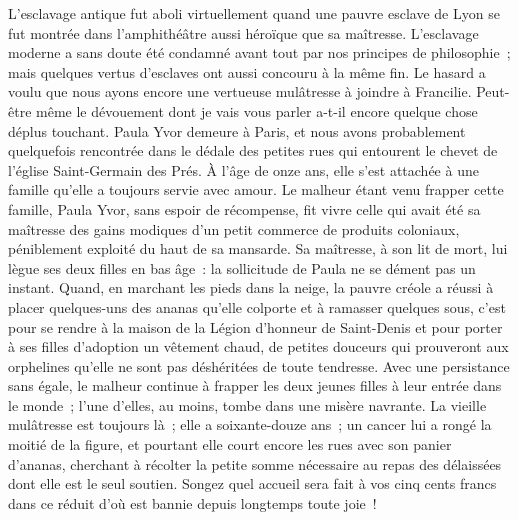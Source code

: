 \documentclass[french,twoside]{book} %
\newcommand\orgName[1]{#1}
\newcommand\persName[1]{#1}
\newcommand\placeName[1]{#1}
\begin{document}
L’esclavage antique fut aboli virtuellement quand une pauvre esclave de {\placeName Lyon} se fut montrée dans l’amphithéâtre aussi héroïque que sa maîtresse. L’esclavage moderne a sans doute été condamné avant tout par nos principes de philosophie ; mais quelques vertus d’esclaves ont aussi concouru à la même fin. Le hasard a voulu que nous ayons encore une vertueuse mulâtresse à joindre à {\persName Francilie}. Peut-être même le dévouement dont je vais vous parler a-t-il encore quelque chose déplus touchant. {\persName Paula Yvor} demeure à {\placeName Paris}, et nous avons probablement quelquefois rencontrée dans le dédale des petites rues qui entourent le chevet de l’{\placeName église Saint-Germain des Prés}. À l’âge de onze ans, elle s’est attachée à une famille qu’elle a toujours servie avec amour. Le malheur étant venu frapper cette famille, {\persName Paula Yvor}, sans espoir de récompense, fit vivre celle qui avait été sa maîtresse des gains modiques d’un petit commerce de produits coloniaux, péniblement exploité du haut de sa mansarde. Sa maîtresse, à son lit de mort, lui lègue ses deux filles en bas âge : la sollicitude de {\persName Paula} ne se dément pas un instant. Quand, en marchant les pieds dans la neige, la pauvre créole a réussi à placer quelques-uns des ananas qu’elle colporte et à ramasser quelques sous, c’est pour se rendre à la maison de la {\orgName Légion d’honneur de Saint-Denis} et pour porter à ses filles d’adoption un vêtement chaud, de petites douceurs qui prouveront aux orphelines qu’elle ne sont pas déshéritées de toute tendresse. Avec une persistance sans égale, le malheur continue à frapper les deux jeunes filles à leur entrée dans le monde ; l’une d’elles, au moins, tombe dans une misère navrante. La vieille mulâtresse est toujours là ; elle a soixante-douze ans ; un cancer lui a rongé la moitié de la figure, et pourtant elle court encore les rues avec son panier d’ananas, cherchant à récolter la petite somme nécessaire au repas des délaissées dont elle est le seul soutien. Songez quel accueil sera fait à vos cinq cents francs dans ce réduit d’où est bannie depuis longtemps toute joie !\par
\end{document}
